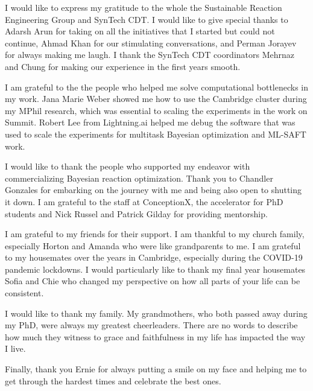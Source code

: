 I would like to express my gratitude to the whole the Sustainable Reaction Engineering Group and SynTech CDT. I would like to give special thanks to Adarsh Arun for taking on all the initiatives that I started but could not continue, Ahmad Khan for our stimulating conversations, and Perman Jorayev for always making me laugh. I thank the SynTech CDT coordinators Mehrnaz and Chung for making our experience in the first years smooth.

I am grateful to the the people who helped me solve computational bottlenecks in my work. Jana Marie Weber showed me how to use the Cambridge cluster during my MPhil research, which was essential to scaling the experiments in the work on Summit. Robert Lee from Lightning.ai helped me debug the software that was used to scale the experiments for multitask Bayesian optimization and ML-SAFT work. 

I would like to thank the people who supported my endeavor with commercializing Bayesian reaction optimization. Thank you to  Chandler Gonzales  for embarking on the journey with me and being also open to shutting it down.  I am grateful to the staff at ConceptionX, the accelerator for PhD students and Nick Russel and Patrick Gilday for providing mentorship.  

I am grateful to my friends for their support. I am thankful to my church family, especially Horton and Amanda who were like grandparents to me. I am grateful to my housemates over the years in Cambridge, especially during the COVID-19 pandemic lockdowns. I would particularly like to thank my final year housemates Sofia and Chie who changed my perspective on how all parts of your life can be consistent. 

I would like to thank my family. My grandmothers, who both passed away during my PhD, were always my greatest cheerleaders. There are no words to describe how much they witness to grace and faithfulness in my life has impacted the way I live. 

Finally, thank you Ernie for always putting a smile on my face and helping me to get through the hardest times and celebrate the best ones.





